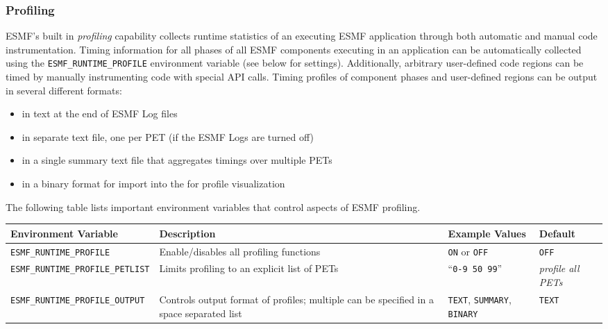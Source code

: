 %

\subsubsection{Profiling}
\label{sec:Profiling}

ESMF's built in {\em profiling} capability collects runtime statistics
of an executing ESMF application through both automatic and manual code
instrumentation. Timing information for all phases of all ESMF components
executing in an application can be automatically collected using the
{\tt ESMF\_RUNTIME\_PROFILE} environment variable (see below for settings).
Additionally, arbitrary user-defined code regions can be timed by
manually instrumenting code with special API calls.  Timing profiles
of component phases and user-defined regions can be output in several
different formats:
\begin{itemize}
\item in text at the end of ESMF Log files
\item in separate text file, one per PET (if the ESMF Logs are turned off)
\item in a single summary text file that aggregates timings over multiple PETs
\item in a binary format for import into the  for profile visualization
\end{itemize}

The following table lists important environment variables that control
aspects of ESMF profiling.

\begin{tabular} {|p{6cm}|p{8cm}|p{6cm}|p{6cm}|}
     \hline\hline
     {\bf Environment Variable} & {\bf Description} & {\bf Example Values} & {\bf Default}\\
     \hline\hline
     {\tt ESMF\_RUNTIME\_PROFILE} & Enable/disables all profiling functions & {\tt ON} or {\tt OFF} & {\tt OFF} \\
     \hline\hline
     {\tt ESMF\_RUNTIME\_PROFILE\_PETLIST} & Limits profiling to an explicit list of PETs & ``{\tt 0-9 50 99}'' & {\em profile all PETs}\\
     \hline\hline
     {\tt ESMF\_RUNTIME\_PROFILE\_OUTPUT} & Controls output format of profiles;  multiple can be specified in a space separated list & {\tt TEXT}, {\tt SUMMARY}, {\tt BINARY} & {\tt TEXT} \\
     \hline\hline
\end{tabular}


